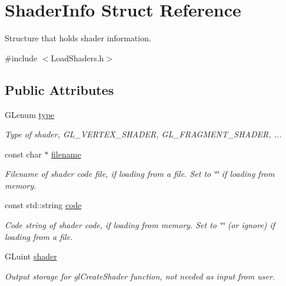 \hypertarget{struct_shader_info}{}\section{Shader\+Info Struct Reference}
\label{struct_shader_info}


Structure that holds shader information.  




{\ttfamily \#include $<$Load\+Shaders.\+h$>$}

\subsection*{Public Attributes}
\begin{DoxyCompactItemize}
\item 
\mbox{\label{struct_shader_info_aae59d69d974c42affdd732edf0014abf}} 
G\+Lenum \hyperlink{struct_shader_info_aae59d69d974c42affdd732edf0014abf}{type}
\begin{DoxyCompactList}\small\item\em Type of shader, G\+L\+\_\+\+V\+E\+R\+T\+E\+X\+\_\+\+S\+H\+A\+D\+ER, G\+L\+\_\+\+F\+R\+A\+G\+M\+E\+N\+T\+\_\+\+S\+H\+A\+D\+ER, ... \end{DoxyCompactList}\item 
\mbox{\label{struct_shader_info_a75c80a5ffc094cc7270ee3ebf2baccfa}} 
const char $\ast$ \hyperlink{struct_shader_info_a75c80a5ffc094cc7270ee3ebf2baccfa}{filename}
\begin{DoxyCompactList}\small\item\em Filename of shader code file, if loading from a file. Set to \char`\"{}\char`\"{} if loading from memory. \end{DoxyCompactList}\item 
\mbox{\label{struct_shader_info_accea55bc0ce5331445d533c743f4aaec}} 
const std\+::string \hyperlink{struct_shader_info_accea55bc0ce5331445d533c743f4aaec}{code}
\begin{DoxyCompactList}\small\item\em Code string of shader code, if loading from memory. Set to \char`\"{}\char`\"{} (or ignore) if loading from a file. \end{DoxyCompactList}\item 
\mbox{\label{struct_shader_info_a3cd9d4d38b46fc44936f5fdbf61fff2a}} 
G\+Luint \hyperlink{struct_shader_info_a3cd9d4d38b46fc44936f5fdbf61fff2a}{shader}
\begin{DoxyCompactList}\small\item\em Output storage for gl\+Create\+Shader function, not needed as input from user. \end{DoxyCompactList}\end{DoxyCompactItemize}


